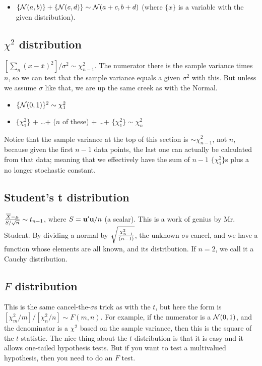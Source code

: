 \begin{itemize}
\item $\{{\cal N} (a,b)\} + \{{\cal N} (c,d)\} \sim {\cal N}
(a+c,b+d)$ (where $\{x\}$ is a variable with the given distribution).
\end{itemize}

\subsection{$\chi^2$ distribution} $[\sum_n (x-\overline
x)^2]/\sigma^2\sim \chi^2_{n-1}$. The numerator there is the sample
variance times $n$, so we can test that the sample variance equals a
given $\sigma^2$ with this. But unless we assume $\sigma$ like that,
we are up the same creek as with the Normal.

\begin{itemize}
\item $\{{\cal N} (0,1)\}^2 \sim \chi^2_1$

\item $\{\chi^2_1\}$ + \dots + ($n$ of these) + \dots + $\{\chi^2_1\} \sim \chi^2_n$

\end{itemize}			\label{chisq}

Notice that the sample variance at the top of this section is $\sim
\chi^2_{n-1}$, not $n$, because given the first $n-1$ data points, the
last one can actually be calculated from that data; meaning that we
effectively have the sum of $n-1$ $\{\chi^2_1\}$s plus a no longer
stochastic constant.

\subsection{Student's t distribution}  ${\overline X - \mu \over S/\sqrt{n}}\sim
t_{n-1}$, where $S={\bf u}'{\bf u}/n$ (a scalar). This is a work of genius by
Mr. Student.  By dividing a normal by $\sqrt{\chi^2_{n-1}\over (n-1)}$, the
unknown $\sigma$s cancel, and we have a function whose elements are all
known, and its distribution.  If $n=2$, we call it a Cauchy distribution.
\label{tstat}


\subsection{$F$ distribution}  This is the same cancel-the-$\sigma$s trick as with the $t$, but here the form
is $[\chi^2_m/m]/[\chi^2_n/n]\sim F(m,n)$. For example, if the numerator
is a ${\cal N}(0,1)$, and the denominator is a $\chi^2$ based on the
sample variance, then this is the square of the $t$ statistic.
The nice thing about the $t$ distribution is that it is easy and it
allows one-tailed hypothesis tests. But if you want to test a
multivalued hypothesis, then you need to do an $F$ test.

